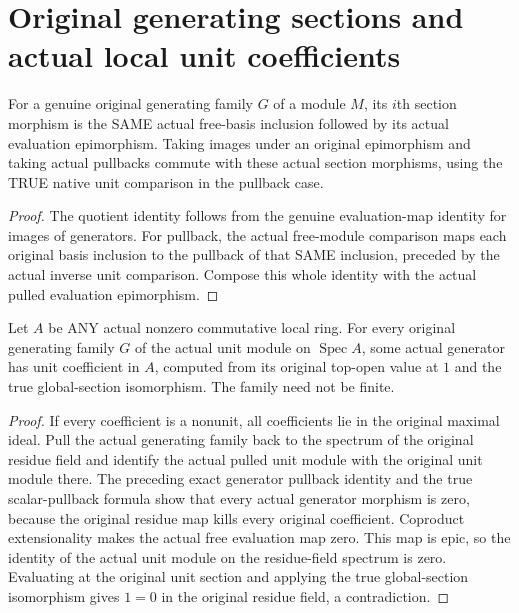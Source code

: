 \section{Original generating sections and actual local unit coefficients}

\begin{definition}
\label{def:actual-generating-section-hom}
\leanok
For a genuine original generating family $G$ of a module $M$, its $i$th
section morphism is the SAME actual free-basis inclusion followed by its
actual evaluation epimorphism. Taking images under an original epimorphism
and taking actual pullbacks commute with these actual section morphisms,
using the TRUE native unit comparison in the pullback case.
\end{definition}
\begin{proof}
The quotient identity follows from the genuine evaluation-map identity for
images of generators. For pullback, the actual free-module comparison
maps each original basis inclusion to the pullback of that SAME inclusion,
preceded by the actual inverse unit comparison. Compose this whole
identity with the actual pulled evaluation epimorphism.
\end{proof}

\begin{theorem}
\label{thm:actual-local-unit-generator}
\leanok
{}
Let $A$ be ANY actual nonzero commutative local ring. For every original
generating family $G$ of the actual unit module on $\operatorname{Spec}A$,
some actual generator has unit coefficient in $A$, computed from its
original top-open value at $1$ and the true global-section isomorphism.
The family need not be finite.
\end{theorem}
\begin{proof}
If every coefficient is a nonunit, all coefficients lie in the original
maximal ideal. Pull the actual generating family back to the spectrum of
the original residue field and identify the actual pulled unit module
with the original unit module there. The preceding exact generator
pullback identity and the true scalar-pullback formula show that every
actual generator morphism is zero, because the original residue map kills
every original coefficient. Coproduct extensionality makes the actual
free evaluation map zero. This map is epic, so the identity of the actual
unit module on the residue-field spectrum is zero. Evaluating at the
original unit section and applying the true global-section isomorphism
gives $1=0$ in the original residue field, a contradiction.
\end{proof}
